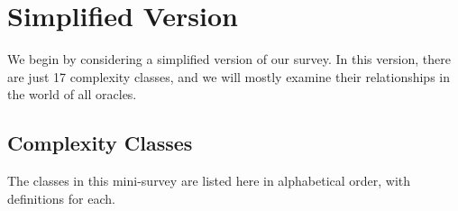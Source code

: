 \section{Simplified Version} \label{simplified-version}

We begin by considering a simplified version of our survey. In this version,
there are just 17 complexity classes, and we will mostly examine their 
relationships in the world of all oracles.

\subsection{Complexity Classes}\label{class-definitions}

The classes in this mini-survey are listed here in alphabetical order, with
definitions for each.

